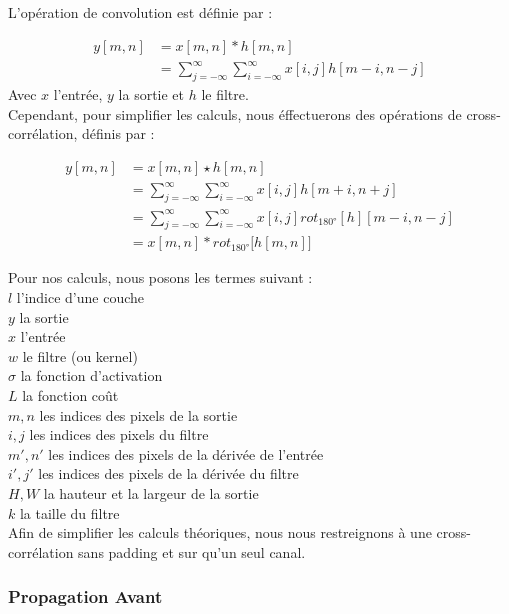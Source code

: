 \begin{multicols}{2}
L'opération de convolution est définie par : 

\begin{align}
y[m,n] &= x[m,n] * h[m,n]\\
&=\sum^{\infty }_{j=-\infty}\sum^{\infty }_{i=-\infty}x[i,j]h[m-i,n-j]
\end{align}
Avec $x$ l'entrée, $y$ la sortie et $h$ le filtre.\\

Cependant, pour simplifier les calculs, nous éffectuerons des opérations de cross-corrélation, définis par : 

\begin{align}
    y[m,n] &= x[m,n] \star h[m,n]\\
    &=\sum^{\infty }_{j=-\infty}\sum^{\infty }_{i=-\infty}x[i,j]h[m+i,n+j]\\
    &= \sum^{\infty }_{j=-\infty}\sum^{\infty }_{i=-\infty}x[i,j] rot_{\ang{180}}[h][m-i,n-j] \\
    &= x[m,n] * rot_{\ang{180}} \big[h[m,n] \big]
\end{align}

Pour nos calculs, nous posons les termes suivant : \\

$l$ l'indice d'une couche\\
$y$ la sortie\\
$x$ l'entrée\\
$w$ le filtre (ou kernel) \\
$\sigma$ la fonction d'activation\\
$L$ la fonction coût\\
$m,n$ les indices des pixels de la sortie\\
$i,j$ les indices des pixels du filtre\\
$m',n'$ les indices des pixels de la dérivée de l'entrée\\
$i',j'$ les indices des pixels de la dérivée du filtre\\
$H,W$ la hauteur et la largeur de la sortie\\
$k$ la taille du filtre \\

Afin de simplifier les calculs théoriques, nous nous restreignons à une 
cross-corrélation sans padding et sur qu'un seul canal. \\

\subsubsection{Propagation Avant}


\end{multicols}
